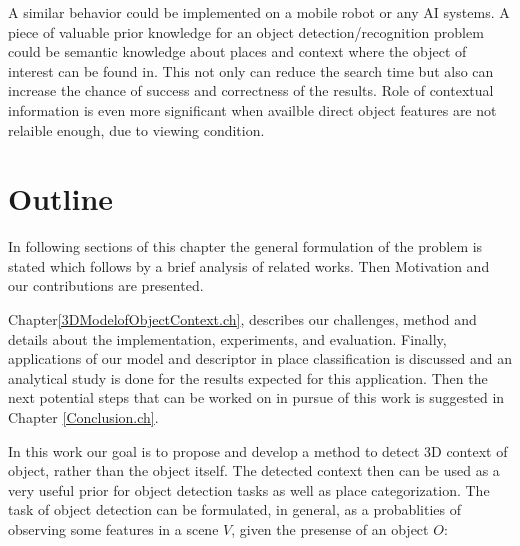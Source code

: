A similar behavior could be implemented on a mobile robot or any AI systems.
A piece of valuable prior knowledge for an object detection/recognition problem could be semantic knowledge about places and context where the object of interest can be found in. This not only can reduce the search time but also can increase the chance of success and correctness of the results. Role of contextual information is even more significant when availble direct object features are not relaible enough, due to viewing condition. 


\section {Outline}
\label{Outline.sec}

In following sections of this chapter the general formulation of the problem is stated which follows by a brief analysis of related works. Then Motivation and our contributions are presented.


Chapter\ref{3DModelofObjectContext.ch}, describes our challenges, method and details about the implementation, experiments, and evaluation. 
Finally, applications of our model and descriptor in place classification is discussed and an analytical study is done for the results expected for this application. Then the next potential steps that can be worked on in pursue of this work is suggested in Chapter \ref{Conclusion.ch}.



In this work our goal is to propose and develop a method to detect 3D context of object, rather than the object itself. The detected context then can be used as a very useful prior for object detection tasks as well as place categorization. The task of object detection can be formulated, in general, as a probablities of observing some features in a scene $V$, given the presense of an object $O$:

